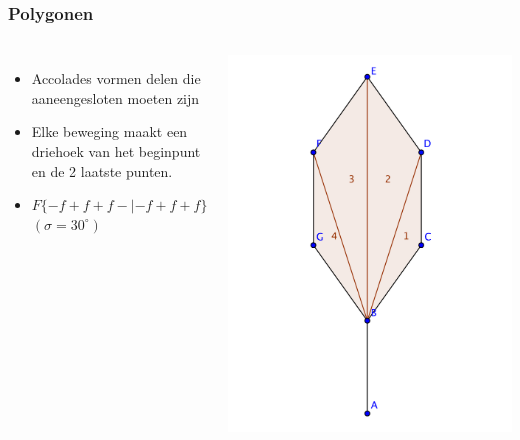 \documentclass[ignorenonframetext,compress]{beamer}
\begin{document}
\begin{frame}[fragile]
	\frametitle{Polygonen}
\begin{columns}[c]
\begin{itemize}
\item Accolades vormen delen die aaneengesloten moeten zijn
\item Elke beweging maakt een driehoek van het beginpunt en de 2 laatste punten.
\pause
\item $F\{-f+f+f-|-f+f+f\}$ $(\sigma = 30^{\circ})$
\end{itemize}
\includegraphics[width=\textwidth]{polygons.pdf}
\end{columns}
\end{frame}
\end{document}
